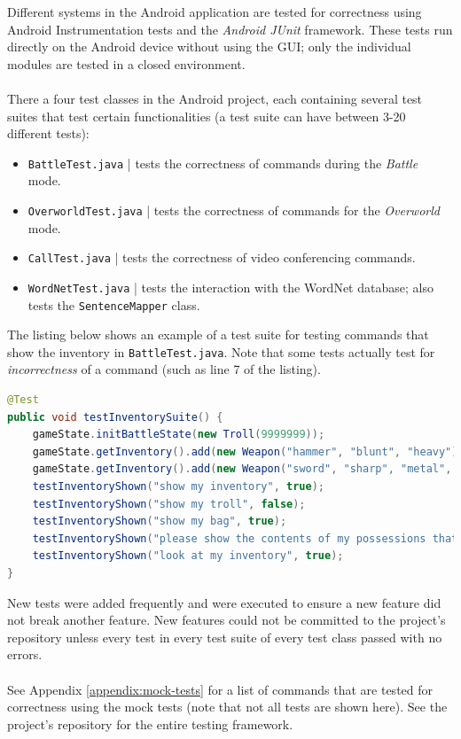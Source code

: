 \documentclass[11pt]{article}
\begin{document}
Different systems in the Android application are tested for correctness using Android Instrumentation tests and the \textit{Android JUnit} framework. These tests run directly on the Android device without using the GUI; only the individual modules are tested in a closed environment.
\\
\\
There a four test classes in the Android project, each containing several test suites that test certain functionalities (a test suite can have between 3-20 different tests):

\begin{itemize}
\item \texttt{BattleTest.java} | tests the correctness of commands during the \textit{Battle} mode.

\item \texttt{OverworldTest.java} | tests the correctness of commands for the \textit{Overworld} mode.

\item \texttt{CallTest.java} | tests the correctness of video conferencing commands.

\item \texttt{WordNetTest.java} | tests the interaction with the WordNet database; also tests the \texttt{SentenceMapper} class. 
\end{itemize}

The listing below shows an example of a test suite for testing commands that show the inventory in \texttt{BattleTest.java}. Note that some tests actually test for \textit{incorrectness} of a command (such as line 7 of the listing).

\begin{lstlisting}[language=Java, label=lst:battle-test-inventory]
@Test
public void testInventorySuite() {
    gameState.initBattleState(new Troll(9999999));
    gameState.getInventory().add(new Weapon("hammer", "blunt", "heavy"));
    gameState.getInventory().add(new Weapon("sword", "sharp", "metal", "pointy"));
    testInventoryShown("show my inventory", true);
    testInventoryShown("show my troll", false);
    testInventoryShown("show my bag", true);
    testInventoryShown("please show the contents of my possessions that I have", true);
    testInventoryShown("look at my inventory", true);
}
\end{lstlisting}

New tests were added frequently and were executed to ensure a new feature did not break another feature. New features could not be committed to the project's repository unless every test in every test suite of every test class passed with no errors.
\\
\\
See Appendix \ref{appendix:mock-tests} for a list of commands that are tested for correctness using the mock tests (note that not all tests are shown here). See the project's repository for the entire testing framework.
\end{document}
